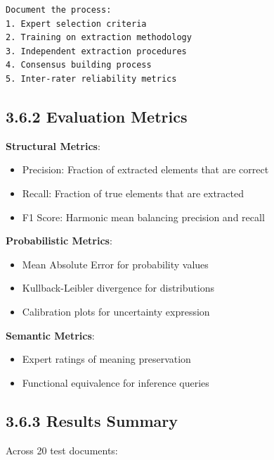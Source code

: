 \documentclass[
  11pt,
  letterpaper,
]{book}
\providecommand{\tightlist}{%
  \setlength{\itemsep}{0pt}\setlength{\parskip}{0pt}}
\begin{document}
\begin{verbatim}
Document the process:
1. Expert selection criteria
2. Training on extraction methodology
3. Independent extraction procedures
4. Consensus building process
5. Inter-rater reliability metrics
\end{verbatim}

\subsection*{3.6.2 Evaluation Metrics}\label{sec-evaluation-metrics}

\textbf{Structural Metrics}:

\begin{itemize}
\tightlist
\item
  Precision: Fraction of extracted elements that are correct
\item
  Recall: Fraction of true elements that are extracted
\item
  F1 Score: Harmonic mean balancing precision and recall
\end{itemize}

\textbf{Probabilistic Metrics}:

\begin{itemize}
\tightlist
\item
  Mean Absolute Error for probability values
\item
  Kullback-Leibler divergence for distributions
\item
  Calibration plots for uncertainty expression
\end{itemize}

\textbf{Semantic Metrics}:

\begin{itemize}
\tightlist
\item
  Expert ratings of meaning preservation
\item
  Functional equivalence for inference queries
\end{itemize}

\subsection*{3.6.3 Results Summary}\label{sec-validation-results}

Across 20 test documents:
\end{document}
